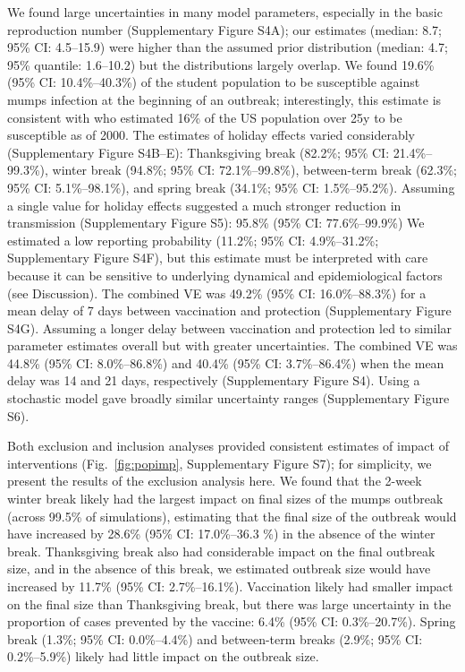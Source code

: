 \documentclass[12pt]{article}
\newcommand{\fref}[1]{Fig.~\ref{fig:#1}}
\begin{document}
We found large uncertainties in many model parameters, especially in the basic reproduction number (Supplementary Figure S4A); our estimates (median: 8.7; 95\% CI: 4.5--15.9) were higher than the assumed prior distribution (median: 4.7; 95\% quantile: 1.6--10.2) but the distributions largely overlap.
We found 19.6\% (95\% CI: 10.4\%--40.3\%) of the student population to be susceptible against mumps infection at the beginning of an outbreak;
interestingly, this estimate is consistent with \cite{gokhale2023disentangling} who estimated 16\% of the US population over 25y to be susceptible as of 2000.
The estimates of holiday effects varied considerably (Supplementary Figure S4B--E): Thanksgiving break (82.2\%; 95\% CI: 21.4\%--99.3\%), winter break (94.8\%; 95\% CI: 72.1\%--99.8\%), between-term break (62.3\%; 95\% CI: 5.1\%--98.1\%), and spring break (34.1\%; 95\% CI: 1.5\%--95.2\%). 
Assuming a single value for holiday effects suggested a much stronger reduction in transmission (Supplementary Figure S5): 95.8\% (95\% CI: 77.6\%--99.9\%)
We estimated a low reporting probability (11.2\%; 95\% CI: 4.9\%--31.2\%; Supplementary Figure S4F), but this estimate must be interpreted with care because it can be sensitive to underlying dynamical and epidemiological factors (see Discussion).
The combined VE was 49.2\% (95\% CI: 16.0\%--88.3\%) for a mean delay of 7 days between vaccination and protection (Supplementary Figure S4G). 
Assuming a longer delay between vaccination and protection led to similar parameter estimates overall but with greater uncertainties.
The combined VE was 44.8\% (95\% CI: 8.0\%--86.8\%) and 40.4\% (95\% CI: 3.7\%--86.4\%) when the mean delay was 14 and 21 days, respectively (Supplementary Figure S4).
Using a stochastic model gave broadly similar uncertainty ranges (Supplementary Figure S6).

Both exclusion and inclusion analyses provided consistent estimates of impact of interventions (\fref{popimp}, Supplementary Figure S7); for simplicity, we present the results of the exclusion analysis here.
We found that the 2-week winter break likely had the largest impact on final sizes of the mumps outbreak (across 99.5\% of simulations), estimating that the final size of the outbreak would have increased by 28.6\% (95\% CI: 17.0\%--36.3 \%) in the absence of the winter break.
Thanksgiving break also had considerable impact on the final outbreak size, and in the absence of this break, we estimated outbreak size would have increased by 11.7\% (95\% CI: 2.7\%--16.1\%).
Vaccination likely had smaller impact on the final size than Thanksgiving break, but there was large uncertainty in the proportion of cases prevented by the vaccine: 6.4\% (95\% CI: 0.3\%--20.7\%).
Spring break (1.3\%; 95\% CI: 0.0\%--4.4\%) and between-term breaks (2.9\%; 95\% CI: 0.2\%--5.9\%) likely had little impact on the outbreak size.
\end{document}
